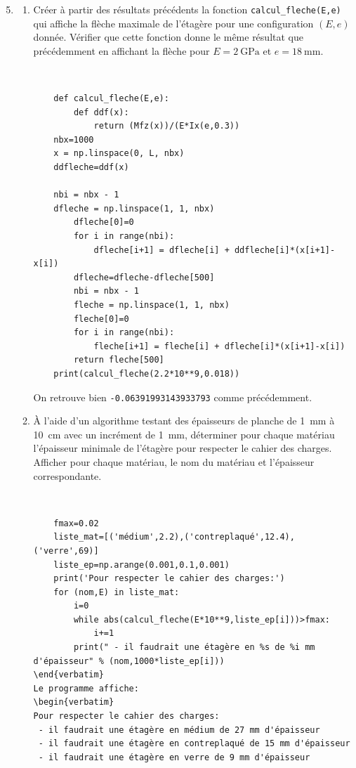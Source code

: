 \begin{enumerate}
\setcounter{enumi}{4}
\item \begin{enumerate}
\item Créer à partir des résultats précédents la fonction \verb?calcul_fleche(E,e)? qui affiche la flèche maximale de l'étagère pour une configuration $(E,e)$ donnée. Vérifier que cette fonction donne le même résultat que précédemment en affichant la flèche pour $E=\SI{2}{\giga\pascal}$ et $e=\SI{18}{\milli\meter}$.
 \begin{solution}~\ \\
  \begin{verbatim}
	def calcul_fleche(E,e):
    	def ddf(x):
	        return (Mfz(x))/(E*Ix(e,0.3))
 	nbx=1000
  	x = np.linspace(0, L, nbx)
  	ddfleche=ddf(x)

	nbi = nbx - 1
  	dfleche = np.linspace(1, 1, nbx)
    	dfleche[0]=0
    	for i in range(nbi):
        	dfleche[i+1] = dfleche[i] + ddfleche[i]*(x[i+1]-x[i])
    	dfleche=dfleche-dfleche[500]
    	nbi = nbx - 1
    	fleche = np.linspace(1, 1, nbx)
    	fleche[0]=0
    	for i in range(nbi):
       		fleche[i+1] = fleche[i] + dfleche[i]*(x[i+1]-x[i])
    	return fleche[500]
    print(calcul_fleche(2.2*10**9,0.018))
 \end{verbatim}
On retrouve bien \verb?-0.06391993143933793? comme précédemment.
\end{solution}
\item À l'aide d'un algorithme testant des épaisseurs de planche de \SI{1}{\milli\meter} à \SI{10}{\centi\meter} avec un incrément de \SI{1}{\milli\meter}, déterminer pour chaque matériau l'épaisseur minimale de l'étagère pour respecter le cahier des charges. Afficher pour chaque matériau, le nom du matériau et l'épaisseur correspondante. 
 \begin{solution}~\ \\
  \begin{verbatim}
	fmax=0.02
	liste_mat=[('médium',2.2),('contreplaqué',12.4),('verre',69)]
	liste_ep=np.arange(0.001,0.1,0.001)
	print('Pour respecter le cahier des charges:')
	for (nom,E) in liste_mat:
    	i=0
    	while abs(calcul_fleche(E*10**9,liste_ep[i]))>fmax:
        	i+=1
    	print(" - il faudrait une étagère en %s de %i mm d'épaisseur" % (nom,1000*liste_ep[i])) 			\end{verbatim}
Le programme affiche:
\begin{verbatim}
Pour respecter le cahier des charges:
 - il faudrait une étagère en médium de 27 mm d'épaisseur
 - il faudrait une étagère en contreplaqué de 15 mm d'épaisseur
 - il faudrait une étagère en verre de 9 mm d'épaisseur
\end{verbatim}
\end{solution}
\end{enumerate}
\end{enumerate}

